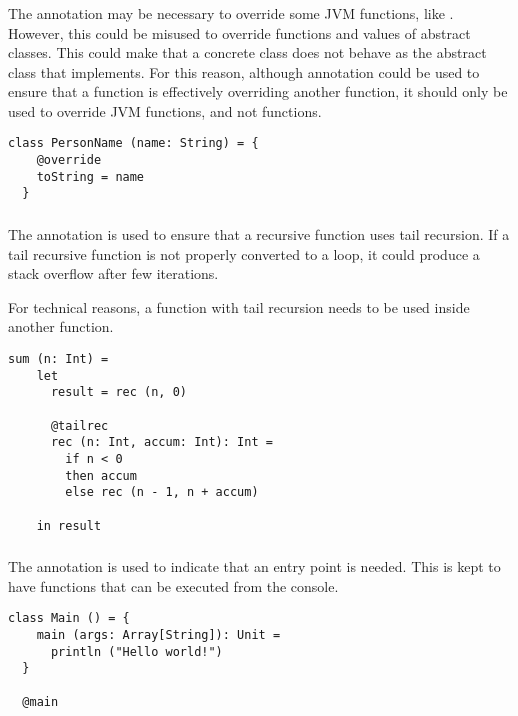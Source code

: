 \subsubsection{\soverride}

The \soverride annotation may be necessary to override some JVM functions, like .
However, this could be misused to override functions and values of abstract classes.
This could make that a concrete class does not behave as the abstract class that implements.
For this reason, although \soverride annotation could be used to ensure that a function is effectively overriding another function, it should only be used to override JVM functions, and not \Soda functions.

\begin{lstlisting}[label={lst:exampleOverride}]
  class PersonName (name: String) = {
    @override
    toString = name
  }
\end{lstlisting}

\subsubsection{\stailrec}

The \stailrec annotation is used to ensure that a recursive function uses tail recursion.
If a tail recursive function is not properly converted to a loop, it could produce a stack overflow after few iterations.

For technical reasons, a function with tail recursion needs to be used inside another function.

\begin{lstlisting}[label={lst:exampleTailrecInside}]
  sum (n: Int) =
    let
      result = rec (n, 0)

      @tailrec
      rec (n: Int, accum: Int): Int =
        if n < 0
        then accum
        else rec (n - 1, n + accum)

    in result
\end{lstlisting}

\subsubsection{\smain}

The \smain annotation is used to indicate that an entry point is needed.
This is kept to have functions that can be executed from the console.

\begin{lstlisting}[label={lst:exampleMain}]
  class Main () = {
    main (args: Array[String]): Unit =
      println ("Hello world!")
  }

  @main
\end{lstlisting}

